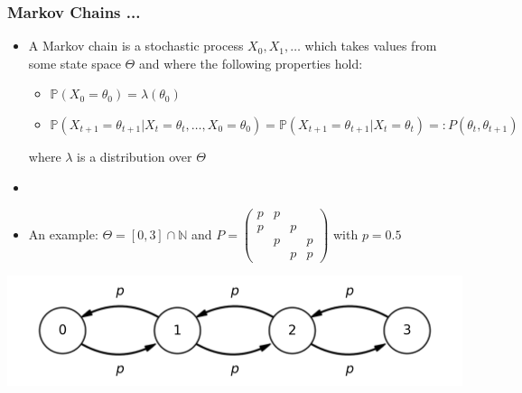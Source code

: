 \begin{frame}[c]
    \frametitle{Markov Chains ...}
    \begin{itemize}
        \item A Markov chain is a stochastic process $X_0, X_1, \ldots$ which takes values from some 
            state space $\Theta$ and where the following properties hold:\vspace{.2cm}
            \begin{itemize}
                \item $ \displaystyle \mathbb{P}(X_{0} = \theta_{0}) = \lambda(\theta_0)$ \vspace{.2cm}
                \item $ \displaystyle
                    \mathbb{P}(X_{t+1} = \theta_{t+1} | X_t = \theta_t , \ldots, X_0 = \theta_0) 
                    = \mathbb{P}(X_{t+1} = \theta_{t+1} | X_t = \theta_t) =: P(\theta_t, \theta_{t+1}) $\vspace{.2cm}
        \end{itemize}
        where $\lambda$ is a distribution over $\Theta$
        \item[] \vspace{-.3cm}
        \item An example: $\Theta = [0, 3]\cap \mathbb{N}$ and $P = \begin{pmatrix} p & p & & \\ p &  & p & \\ & p & & p \\ & & p & p \end{pmatrix}$ with $p = 0.5$
    \end{itemize}
    \vspace{-0.5cm}
    \begin{center}
        \includegraphics[scale=0.8]{imgs/uniformchain.png}
    \end{center}
\end{frame}

